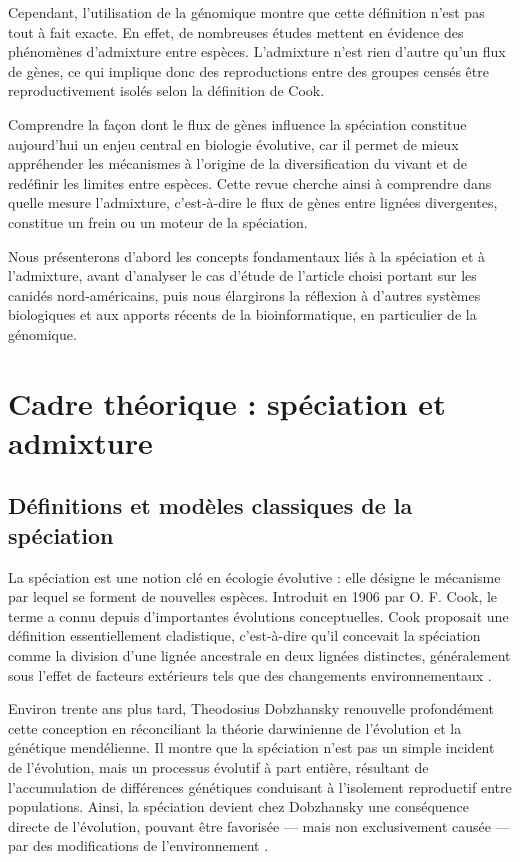 \documentclass[12pt,a4paper]{article}
\begin{document}
Cependant, l’utilisation de la génomique montre que cette définition n’est pas tout à fait exacte. En effet, de nombreuses études mettent en évidence des phénomènes d’admixture entre espèces. L’admixture n’est rien d’autre qu’un flux de gènes, ce qui implique donc des reproductions entre des groupes censés être reproductivement isolés selon la définition de Cook.

Comprendre la façon dont le flux de gènes influence la spéciation constitue aujourd’hui un enjeu central en biologie évolutive, car il permet de mieux appréhender les mécanismes à l’origine de la diversification du vivant et de redéfinir les limites entre espèces.
Cette revue cherche ainsi à comprendre dans quelle mesure l’admixture, c’est-à-dire le flux de gènes entre lignées divergentes, constitue un frein ou un moteur de la spéciation.

Nous présenterons d’abord les concepts fondamentaux liés à la spéciation et à l’admixture, avant d’analyser le cas d’étude de l’article choisi portant sur les canidés nord-américains, puis nous élargirons la réflexion à d’autres systèmes biologiques et aux apports récents de la bioinformatique, en particulier de la génomique.
\section{Cadre théorique : spéciation et admixture}
\subsection{Définitions et modèles classiques de la spéciation}
La spéciation est une notion clé en écologie évolutive : elle désigne le mécanisme par lequel se forment de nouvelles espèces. Introduit en 1906 par O. F. Cook, le terme a connu depuis d’importantes évolutions conceptuelles. Cook proposait une définition essentiellement cladistique, c’est-à-dire qu’il concevait la spéciation comme la division d’une lignée ancestrale en deux lignées distinctes, généralement sous l’effet de facteurs extérieurs tels que des changements environnementaux \parencite{cook1906factors}.

Environ trente ans plus tard, Theodosius Dobzhansky renouvelle profondément cette conception en réconciliant la théorie darwinienne de l’évolution et la génétique mendélienne.
Il montre que la spéciation n’est pas un simple incident de l’évolution, mais un processus évolutif à part entière, résultant de l’accumulation de différences génétiques conduisant à l’isolement reproductif entre populations.
Ainsi, la spéciation devient chez Dobzhansky une conséquence directe de l’évolution, pouvant être favorisée — mais non exclusivement causée — par des modifications de l’environnement \parencite{dobzhansky1951genetics}.
\end{document}
